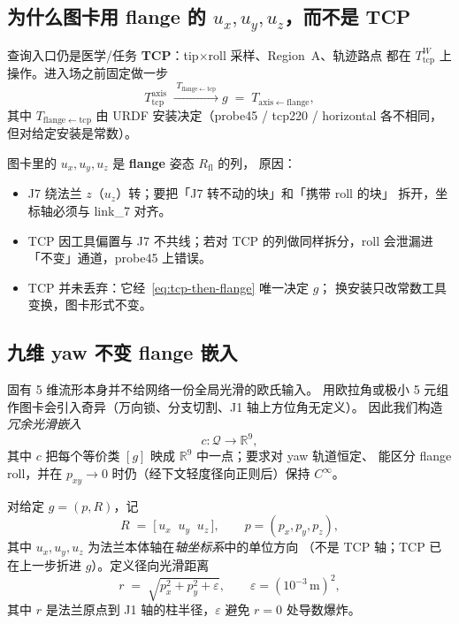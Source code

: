 \documentclass[UTF8,a4paper,11pt,fontset=fandol]{ctexart}
\newcommand{\R}{\mathbb{R}}
\begin{document}
\subsection{为什么图卡用 flange 的 \(u_{x},u_{y},u_{z}\)，而不是 TCP}
\label{sec:why-flange-not-tcp}

查询入口仍是医学/任务 \textbf{TCP}：tip$\times$roll 采样、Region~A、轨迹路点
都在 \(T_{\mathrm{tcp}}^{W}\) 上操作。进入场之前固定做一步
\begin{equation}
\label{eq:tcp-then-flange}
  T_{\mathrm{tcp}}^{\mathrm{axis}}
  \;\xrightarrow{\;T_{\mathrm{flange\leftarrow tcp}}\;}
  g
  \;=\;
  T_{\mathrm{axis\leftarrow flange}},
\end{equation}
其中 \(T_{\mathrm{flange\leftarrow tcp}}\) 由 URDF 安装决定（probe45 / tcp220 /
horizontal 各不相同，但对给定安装是常数）。

图卡里的 \(u_{x},u_{y},u_{z}\) 是 \textbf{flange} 姿态 \(R_{\mathrm{fl}}\) 的列，
原因：
\begin{itemize}[leftmargin=1.4em]
  \item J7 绕法兰 \(z\)（\(u_{z}\)）转；要把「J7 转不动的块」和「携带 roll 的块」
        拆开，坐标轴必须与 link\_7 对齐。
  \item TCP 因工具偏置与 J7 不共线；若对 TCP 的列做同样拆分，roll 会泄漏进
        「不变」通道，probe45 上错误。
  \item TCP 并未丢弃：它经~\eqref{eq:tcp-then-flange} 唯一决定 \(g\)；
        换安装只改常数工具变换，图卡形式不变。
\end{itemize}

\subsection{九维 yaw 不变 flange 嵌入}
\label{sec:9d}

固有 5 维流形本身并不给网络一份全局光滑的欧氏输入。
用欧拉角或极小 5 元组作图卡会引入奇异（万向锁、分支切割、J1 轴上方位角无定义）。
因此我们构造\emph{冗余光滑嵌入}
\begin{equation}
\label{eq:embedding-goal}
  c:\mathcal{Q}\longrightarrow\R^{9},
\end{equation}
其中 \(c\) 把每个等价类 \([g]\) 映成 \(\R^{9}\) 中一点；要求对 yaw 轨道恒定、
能区分 flange roll，并在 \(p_{xy}\to 0\) 时仍（经下文轻度径向正则后）保持 \(C^{\infty}\)。

对给定 \(g=(p,R)\)，记
\begin{equation}
\label{eq:flange-axes}
  R
  \;=\;
  \bigl[\,u_{x}\;\; u_{y}\;\; u_{z}\,\bigr],
  \qquad
  p=(p_{x},p_{y},p_{z}),
\end{equation}
其中 \(u_{x},u_{y},u_{z}\) 为法兰本体轴在\emph{轴坐标系}中的单位方向
（不是 TCP 轴；TCP 已在上一步折进 \(g\)）。定义径向光滑距离
\begin{equation}
\label{eq:radial}
  r
  \;=\;
  \sqrt{p_{x}^{2}+p_{y}^{2}+\varepsilon},
  \qquad
  \varepsilon=(10^{-3}\,\mathrm{m})^{2},
\end{equation}
其中 \(r\) 是法兰原点到 J1 轴的柱半径，\(\varepsilon\) 避免 \(r=0\) 处导数爆炸。
\end{document}

